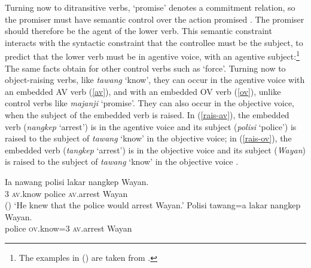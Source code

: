 Turning now to ditransitive verbs,  `promise' denotes a commitment relation, so the promiser must have
semantic control over the action promised \parencites{Farkas1988,Kroeger1993}[]{SagandPollard1991}\addpages. The
promiser should therefore be the agent of the lower verb. This semantic constraint interacts
with the syntactic constraint that the controllee must be the subject, to predict that the
lower verb must be in agentive voice, with an agentive subject:\footnote{%
  The examples in () are taken from .
}
\eal
{}
\zl
The same facts obtain for other control verbs such as  `force'.
Turning now to object-raising verbs, like \emph{tawang} `know',  they can occur in the agentive
voice with an embedded AV verb (\ref{av}), and with an embedded OV verb (\ref{ov}), unlike control
verbs like \emph{majanji} `promise'. 
They can also occur in the objective voice, when the subject of the embedded verb is raised.  In
(\ref{rais-av}), the embedded verb (\emph{nangkep} `arrest') is in the agentive voice and its
subject (\emph{polisi} `police') is raised to the subject of \emph{tawang} `know' in the objective
voice; in (\ref{rais-ov}), the embedded verb (\emph{tangkep} `arrest') is in the objective voice and
its subject (\emph{Wayan}) is raised to the subject of \emph{tawang} `know' in the objective voice \citep[ex 23]{WechslerandArka1998}.

\eal
\ex 
\label{av}
\gll Ia nawang          polisi lakar  nangkep            Wayan. \\
     3 \textsc{av}.know police \FUT{} \textsc{av}.arrest Wayan \\\hfill()
\glt `He knew that the police would arrest Wayan.'
\ex
\label{rais-av} 
\gll Polisi tawang=a           lakar  nangkep            Wayan. \\
     police \textsc{ov}.know=3 \FUT{} \textsc{av}.arrest Wayan\\

